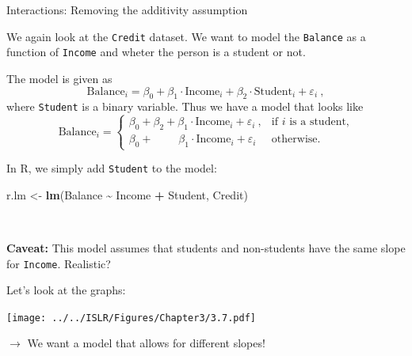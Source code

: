 \documentclass[
  10pt,
  ignorenonframetext,
]{beamer}
\newenvironment{Shaded}{\begin{snugshade}}{\end{snugshade}}
\newcommand{\FunctionTok}[1]{\textcolor[rgb]{0.13,0.29,0.53}{\textbf{#1}}}
\newcommand{\NormalTok}[1]{#1}
\newcommand{\OtherTok}[1]{\textcolor[rgb]{0.56,0.35,0.01}{#1}}
\newcommand{\SpecialCharTok}[1]{\textcolor[rgb]{0.81,0.36,0.00}{\textbf{#1}}}
\begin{document}
\begin{frame}[fragile]
\begin{block}{Interactions: Removing the additivity assumption}
\protect\hypertarget{interactions-removing-the-additivity-assumption}{}
\vspace{2mm}

We again look at the \texttt{Credit} dataset. We want to model the
\texttt{Balance} as a function of \texttt{Income} and wheter the person
is a student or not.

\vspace{2mm}

The model is given as
\[\text{Balance}_i = \beta_0 + \beta_1 \cdot \text{Income}_i + \beta_2 \cdot \text{Student}_i + \varepsilon_i \ ,\]
where \texttt{Student} is a binary variable. Thus we have a model that
looks like \begin{equation*}
\text{Balance}_i = \left\{ 
\begin{array}{ll}
\beta_0 + \beta_2 + \beta_1 \cdot \text{Income}_i  + \varepsilon_i \ ,  & \text{if $i$ is a student,}\\
\beta_0 + \qquad \; \beta_1 \cdot \text{Income}_i  + \varepsilon_i  & \text{otherwise.}
\end{array}
\right.
\end{equation*}

\vspace{2mm}

In R, we simply add \texttt{Student} to the model:

\vspace{2mm}

\scriptsize

\begin{Shaded}
\begin{Highlighting}[]
\NormalTok{r.lm }\OtherTok{\textless{}{-}} \FunctionTok{lm}\NormalTok{(Balance }\SpecialCharTok{\textasciitilde{}}\NormalTok{ Income }\SpecialCharTok{+}\NormalTok{ Student, Credit)}
\end{Highlighting}
\end{Shaded}

\(~\)

\normalsize

\textbf{Caveat:} This model assumes that students and non-students have
the same slope for \texttt{Income}. Realistic?
\end{block}
\end{frame}

\begin{frame}
Let's look at the graphs:

\texttt{[image: ../../ISLR/Figures/Chapter3/3.7.pdf]}

\(\rightarrow\) We want a model that allows for different slopes!
\end{frame}
\end{document}
